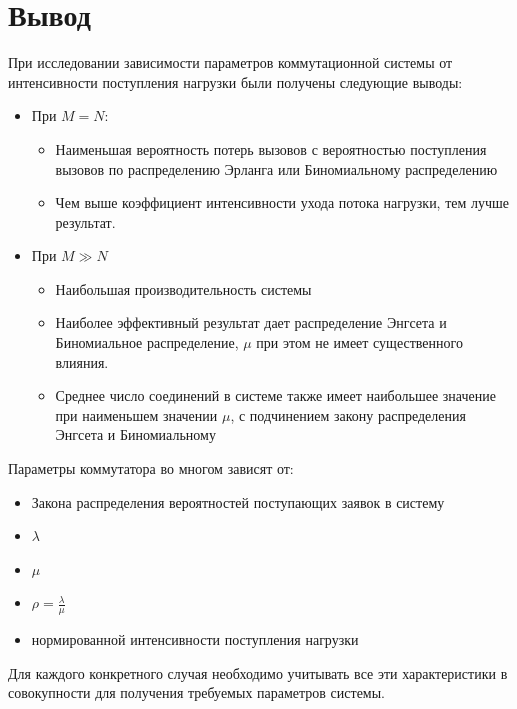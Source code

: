 \documentclass[12pt]{article}
\begin{document}
\section{Вывод}
При исследовании зависимости параметров коммутационной системы от интенсивности поступления нагрузки были получены следующие выводы:
\begin{itemize}
	\item При $M = N$:
	\begin{itemize}
		\item Наименьшая вероятность потерь вызовов с вероятностью поступления вызовов по распределению Эрланга или Биномиальному распределению
		\item Чем выше коэффициент интенсивности ухода потока нагрузки, тем лучше результат.
	\end{itemize}
	\item При $ M ≫ N$
		\begin{itemize}
			\item Наибольшая производительность системы
			\item Наиболее эффективный результат дает распределение Энгсета и Биномиальное распределение, $\mu$ при этом не имеет существенного влияния.
			\item Среднее число соединений в  системе также имеет наибольшее значение при наименьшем значении $\mu$, с подчинением закону распределения Энгсета и Биномиальному
		\end{itemize}
\end{itemize}

Параметры коммутатора во многом зависят от:
\begin{itemize}
	\item Закона распределения вероятностей поступающих заявок в систему
	\item $\lambda$
	\item $\mu$
	\item $\rho = \frac{\lambda}{\mu}$
	\item нормированной интенсивности поступления нагрузки
\end{itemize}
Для каждого конкретного случая необходимо учитывать все эти характеристики в совокупности для получения требуемых параметров системы.
\end{document}
